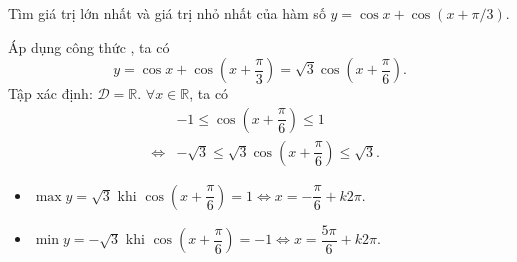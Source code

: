 \begin{bt}%
	Tìm giá trị lớn nhất và giá trị nhỏ nhất của hàm số $ y=\cos x+\cos (x+\pi / 3) $.
	\loigiai
	{
		Áp dụng công thức , ta có
		\begin{equation*}
			y=\cos x+\cos \left (x+\dfrac{\pi}{3}\right )=\sqrt{3}\cos \left (x+\dfrac{\pi}{6}\right ).
		\end{equation*}
		Tập xác định: $ \mathscr{D}=\mathbb{R}$. $ \forall x \in \mathbb{R} $, ta có
		\begin{eqnarray*}
			&&-1 \leq \cos \left (x+\dfrac{\pi}{6}\right ) \leq 1\\
			&\Leftrightarrow&  -\sqrt{3} \leq \sqrt{3}\cos \left (x+\dfrac{\pi}{6}\right ) \leq \sqrt{3}.
		\end{eqnarray*} 
		\begin{itemize}
			\item $ \max y=\sqrt{3} $ khi $ \cos \left (x+\dfrac{\pi}{6}\right ) =1 \Leftrightarrow x=-\dfrac{\pi}{6}+k2\pi$.
			\item $ \min y=-\sqrt{3} $ khi $ \cos \left (x+\dfrac{\pi}{6}\right )=-1 \Leftrightarrow x=\dfrac{5\pi}{6}+k2\pi$.
		\end{itemize}
		
	}
\end{bt}





